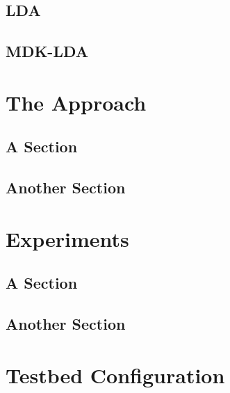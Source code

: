 \documentclass[11pt,twoside]{report}
\begin{document}
\section{LDA}

\section{MDK-LDA}

\chapter{The Approach}

\section{A Section}

\section{Another Section}

\chapter{Experiments}

\section{A Section}

\section{Another Section}

\appendix
\chapter{Testbed Configuration}



\end{document}
